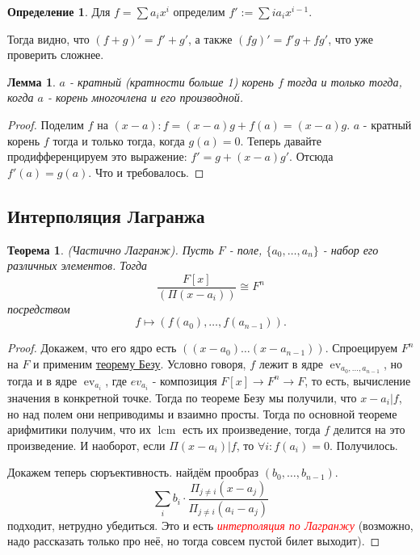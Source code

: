 \documentclass[a4paper,100pt]{article}
\theoremstyle{indented}
\newtheorem{theorem}{Теорема}
\newtheorem{lemma}{Лемма}
\theoremstyle{definition}
\newtheorem{defn}{Определение}
\theoremstyle{remark}
\DeclareMathOperator{\ev}{ev}
\DeclareMathOperator{\lcm}{lcm}
\begin{document}
\begin{defn}
    Для $f=\sum a_i x^i$ определим $f':=\sum ia_i x^{i-1}$.
\end{defn}

Тогда видно, что $(f+g)'=f'+g'$, а также $(fg)'=f'g+fg'$, что уже проверить сложнее.\\

\begin{lemma}
    $a$ - кратный (кратности больше 1) корень $f$ тогда и только тогда, когда $a$ - корень многочлена и его производной.
\end{lemma}

\begin{proof}
    Поделим $f$ на $(x-a):f=(x-a)g+f(a)=(x-a)g$. $a$ - кратный корень $f$ тогда и только тогда, когда $g(a)=0$. Теперь давайте продифференцируем это выражение: $f'=g+(x-a)g'$. Отсюда $f'(a)=g(a)$. Что и требовалось.
\end{proof}

\resetall

\subsection{Интерполяция Лагранжа}

\begin{theorem}
    (Частично Лагранж). Пусть $F$ - поле, $\{a_0, \dots, a_n\}$ - набор его различных элементов. Тогда 
    \[
        \frac{F[x]}{(\Pi(x-a_i))}\cong F^n
    \]
    посредством
    \[
        f\mapsto (f(a_0), \dots, f(a_{n-1})).
    \]
\end{theorem}

\begin{proof}
    Докажем, что его ядро есть $((x-a_0)\dots (x-a_{n-1}))$. Спроецируем $F^n$ на $F$ и применим \hyperlink{n34}{теорему Безу}. Условно говоря, $f$ лежит в ядре $\ev_{a_0, \dots, a_{n-1}}$, но тогда и в ядре $\ev_{a_i}$, где $ev_{a_i}$ - композиция $F[x]\rightarrow F^n\rightarrow F$, то есть, вычисление значения в конкретной точке. Тогда по теореме Безу мы получили, что $x-a_i\vert f$, но над полем они неприводимы и взаимно просты. Тогда по основной теореме арифмитики получим, что их $\lcm$ есть их произведение, тогда $f$ делится на это произведение. И наоборот, если $\Pi(x-a_i)\vert f$, то $\forall i:f(a_i)=0$. Получилось.\ 

    Докажем теперь сюръективность. найдём прообраз $(b_0, \dots, b_{n-1})$.
    \[
        \sum_i b_i\cdot \frac{\Pi_{j\neq i}(x-a_j)}{\Pi_{j\neq i}(a_i-a_j)}
    \]
    подходит, нетрудно убедиться. Это и есть \textcolor{red}{\hypertarget{35}{\textit{интерполяция по Лагранжу}}} (возможно, надо рассказать только про неё, но тогда совсем пустой билет выходит).
\end{proof}
\end{document}
